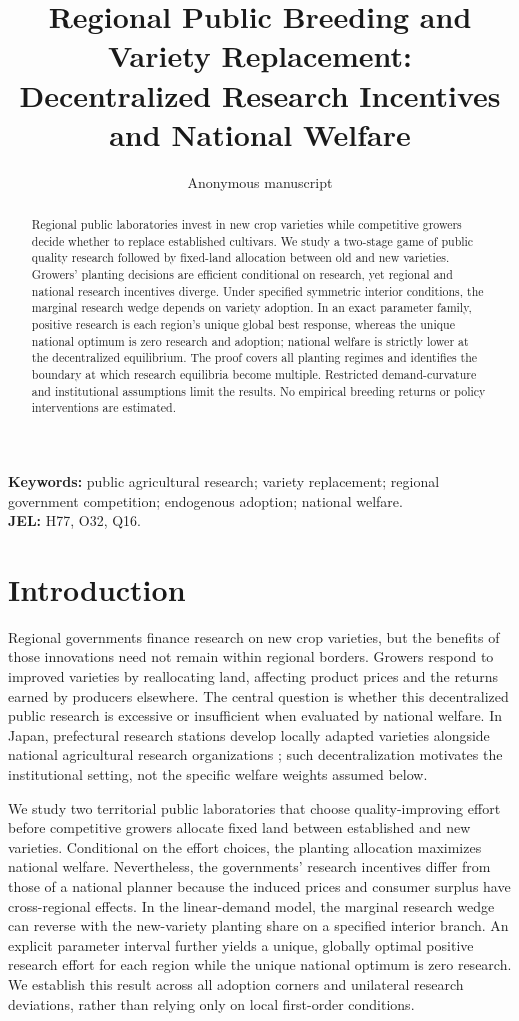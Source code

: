 \documentclass[11pt,a4paper]{article}
\title{Regional Public Breeding and Variety Replacement: Decentralized Research Incentives and National Welfare}
\author{Anonymous manuscript}
\date{}
\begin{document}
\maketitle
\begin{abstract}
Regional public laboratories invest in new crop varieties while competitive growers decide whether to replace established cultivars. We study a two-stage game of public quality research followed by fixed-land allocation between old and new varieties. Growers' planting decisions are efficient conditional on research, yet regional and national research incentives diverge. Under specified symmetric interior conditions, the marginal research wedge depends on variety adoption. In an exact parameter family, positive research is each region's unique global best response, whereas the unique national optimum is zero research and adoption; national welfare is strictly lower at the decentralized equilibrium. The proof covers all planting regimes and identifies the boundary at which research equilibria become multiple. Restricted demand-curvature and institutional assumptions limit the results. No empirical breeding returns or policy interventions are estimated.
\end{abstract}

\noindent\textbf{Keywords:} public agricultural research; variety replacement; regional government competition; endogenous adoption; national welfare.\\
\textbf{JEL:} H77, O32, Q16.

\section{Introduction}
Regional governments finance research on new crop varieties, but the benefits of those innovations need not remain within regional borders. Growers respond to improved varieties by reallocating land, affecting product prices and the returns earned by producers elsewhere. The central question is whether this decentralized public research is excessive or insufficient when evaluated by national welfare. In Japan, prefectural research stations develop locally adapted varieties alongside national agricultural research organizations \citep{oecd2019japan}; such decentralization motivates the institutional setting, not the specific welfare weights assumed below.

We study two territorial public laboratories that choose quality-improving effort before competitive growers allocate fixed land between established and new varieties. Conditional on the effort choices, the planting allocation maximizes national welfare. Nevertheless, the governments' research incentives differ from those of a national planner because the induced prices and consumer surplus have cross-regional effects. In the linear-demand model, the marginal research wedge can reverse with the new-variety planting share on a specified interior branch. An explicit parameter interval further yields a unique, globally optimal positive research effort for each region while the unique national optimum is zero research. We establish this result across all adoption corners and unilateral research deviations, rather than relying only on local first-order conditions.
\end{document}
